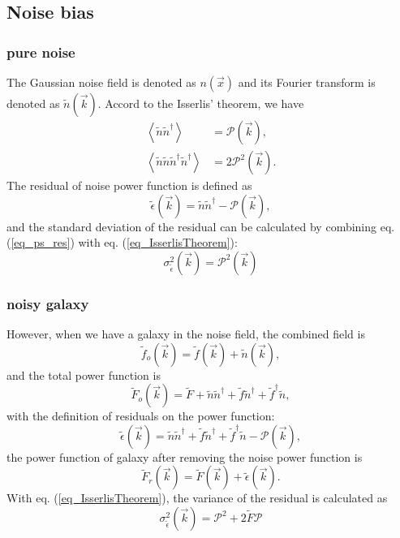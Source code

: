 \subsection{Noise bias}
\label{sec_Method_noise}

\subsubsection{pure noise}

The Gaussian noise field is denoted as $n(\vec{x})$ and its Fourier transform
is denoted as $\tilde{n}(\vec{k})$. Accord to the Isserlis' theorem, we have
\begin{equation}\label{eq_IsserlisTheorem}
\begin{split}
    \left\langle\tilde{n}\tilde{n}^{\dagger}\right\rangle
    &=\mathcal{P}(\vec{k}),\\
    \left\langle\tilde{n}\tilde{n}\tilde{n}^\dagger\tilde{n}^\dagger\right\rangle
    &=2\mathcal{P}^2(\vec{k}).
\end{split}
\end{equation}
The residual of noise power function is defined as
\begin{equation}\label{eq_ps_res}
    \tilde{\epsilon}(\vec{k})=\tilde{n}\tilde{n}^\dagger
    -\mathcal{P}(\vec{k}),
\end{equation}
and the standard deviation of the residual can be calculated by combining
eq.(\ref{eq_ps_res}) with eq.  (\ref{eq_IsserlisTheorem}):
\begin{equation}
\sigma^2_{\tilde{\epsilon}}(\vec{k})=\mathcal{P}^2(\vec{k})
\end{equation}

\subsubsection{noisy galaxy}
However, when we have a galaxy in the noise field, the combined field is
\begin{equation}
    \tilde{f}_o(\vec{k})=\tilde{f}(\vec{k})+\tilde{n}(\vec{k}),
\end{equation}
and the total power function is
\begin{equation}
    \tilde{F}_o(\vec{k})= \tilde{F}+\tilde{n}\tilde{n}^\dagger
    +\tilde{f}\tilde{n}^{\dagger}+\tilde{f}^{\dagger}\tilde{n},
\end{equation}
with the definition of residuals on the power function:
\begin{equation}\label{eq_ps_res_gal}
    \tilde{\epsilon}(\vec{k})=\tilde{n}\tilde{n}^\dagger
    +\tilde{f}\tilde{n}^{\dagger}+\tilde{f}^{\dagger}\tilde{n}
    -\mathcal{P}(\vec{k}),
\end{equation}
the power function of galaxy after removing the noise power function is
\begin{equation}
    \tilde{F}_r(\vec{k})=\tilde{F}(\vec{k})+\tilde{\epsilon}(\vec{k}).
\end{equation}
With eq. (\ref{eq_IsserlisTheorem}), the variance of the residual is calculated
as
\begin{equation}\label{eq_var_res_noisyGal}
    \sigma^2_{\tilde{\epsilon}}(\vec{k})=\mathcal{P}^2+2\tilde{F}\mathcal{P}
\end{equation}

